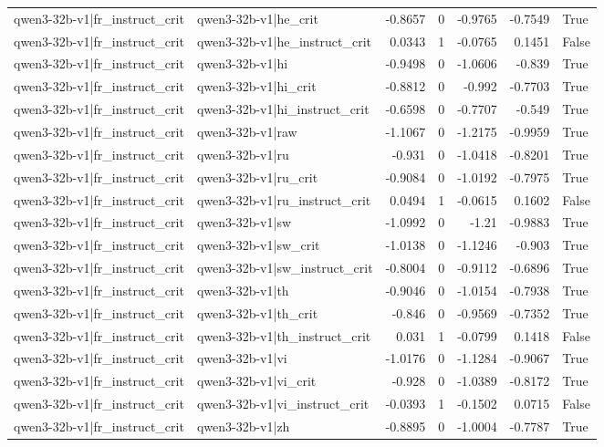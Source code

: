 \begin{table}
\begin{tabular}{l l r r r r l}
qwen3-32b-v1|fr_instruct_crit & qwen3-32b-v1|he_crit & -0.8657 & 0 & -0.9765 & -0.7549 & True \\
qwen3-32b-v1|fr_instruct_crit & qwen3-32b-v1|he_instruct_crit & 0.0343 & 1 & -0.0765 & 0.1451 & False \\
qwen3-32b-v1|fr_instruct_crit & qwen3-32b-v1|hi & -0.9498 & 0 & -1.0606 & -0.839 & True \\
qwen3-32b-v1|fr_instruct_crit & qwen3-32b-v1|hi_crit & -0.8812 & 0 & -0.992 & -0.7703 & True \\
qwen3-32b-v1|fr_instruct_crit & qwen3-32b-v1|hi_instruct_crit & -0.6598 & 0 & -0.7707 & -0.549 & True \\
qwen3-32b-v1|fr_instruct_crit & qwen3-32b-v1|raw & -1.1067 & 0 & -1.2175 & -0.9959 & True \\
qwen3-32b-v1|fr_instruct_crit & qwen3-32b-v1|ru & -0.931 & 0 & -1.0418 & -0.8201 & True \\
qwen3-32b-v1|fr_instruct_crit & qwen3-32b-v1|ru_crit & -0.9084 & 0 & -1.0192 & -0.7975 & True \\
qwen3-32b-v1|fr_instruct_crit & qwen3-32b-v1|ru_instruct_crit & 0.0494 & 1 & -0.0615 & 0.1602 & False \\
qwen3-32b-v1|fr_instruct_crit & qwen3-32b-v1|sw & -1.0992 & 0 & -1.21 & -0.9883 & True \\
qwen3-32b-v1|fr_instruct_crit & qwen3-32b-v1|sw_crit & -1.0138 & 0 & -1.1246 & -0.903 & True \\
qwen3-32b-v1|fr_instruct_crit & qwen3-32b-v1|sw_instruct_crit & -0.8004 & 0 & -0.9112 & -0.6896 & True \\
qwen3-32b-v1|fr_instruct_crit & qwen3-32b-v1|th & -0.9046 & 0 & -1.0154 & -0.7938 & True \\
qwen3-32b-v1|fr_instruct_crit & qwen3-32b-v1|th_crit & -0.846 & 0 & -0.9569 & -0.7352 & True \\
qwen3-32b-v1|fr_instruct_crit & qwen3-32b-v1|th_instruct_crit & 0.031 & 1 & -0.0799 & 0.1418 & False \\
qwen3-32b-v1|fr_instruct_crit & qwen3-32b-v1|vi & -1.0176 & 0 & -1.1284 & -0.9067 & True \\
qwen3-32b-v1|fr_instruct_crit & qwen3-32b-v1|vi_crit & -0.928 & 0 & -1.0389 & -0.8172 & True \\
qwen3-32b-v1|fr_instruct_crit & qwen3-32b-v1|vi_instruct_crit & -0.0393 & 1 & -0.1502 & 0.0715 & False \\
qwen3-32b-v1|fr_instruct_crit & qwen3-32b-v1|zh & -0.8895 & 0 & -1.0004 & -0.7787 & True \\

\end{tabular}
\end{table}
